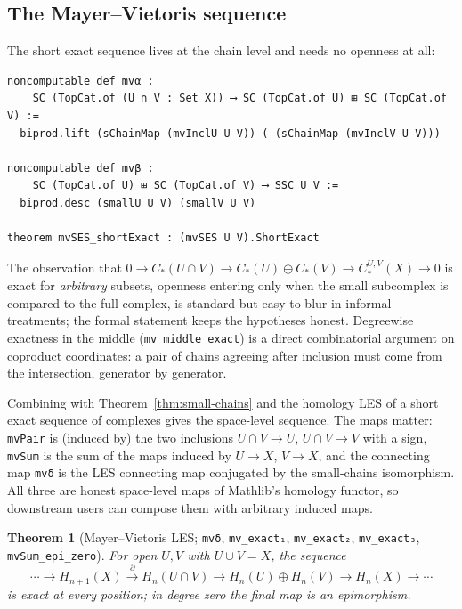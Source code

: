 \documentclass[11pt]{article}
\newtheorem{theorem}{Theorem}[section]
\theoremstyle{remark}
\newcommand{\leanname}[1]{\texttt{#1}}
\begin{document}
\subsection{The Mayer--Vietoris sequence}

The short exact sequence lives at the chain level and needs no openness at
all:

\begin{lstlisting}
noncomputable def mvα :
    SC (TopCat.of (U ∩ V : Set X)) ⟶ SC (TopCat.of U) ⊞ SC (TopCat.of V) :=
  biprod.lift (sChainMap (mvInclU U V)) (-(sChainMap (mvInclV U V)))

noncomputable def mvβ :
    SC (TopCat.of U) ⊞ SC (TopCat.of V) ⟶ SSC U V :=
  biprod.desc (smallU U V) (smallV U V)

theorem mvSES_shortExact : (mvSES U V).ShortExact
\end{lstlisting}

The observation that
$0 \to C_*(U \cap V) \to C_*(U) \oplus C_*(V) \to C^{U,V}_*(X) \to 0$
is exact for \emph{arbitrary} subsets, openness entering only when the small
subcomplex is compared to the full complex, is standard but easy to blur in
informal treatments; the formal statement keeps the hypotheses honest.
Degreewise exactness in the middle
(\leanname{mv\_middle\_exact}) is a direct combinatorial argument on
coproduct coordinates: a pair of chains agreeing after inclusion must come
from the intersection, generator by generator.

Combining with Theorem~\ref{thm:small-chains} and the homology LES of a
short exact sequence of complexes gives the space-level sequence. The maps
matter: \leanname{mvPair} is (induced by) the two inclusions
$U \cap V \to U$, $U \cap V \to V$ with a sign, \leanname{mvSum} is the sum
of the maps induced by $U \to X$, $V \to X$, and the connecting map
\leanname{mvδ} is the LES connecting map conjugated by the small-chains
isomorphism. All three are honest space-level maps of Mathlib's homology
functor, so downstream users can compose them with arbitrary induced maps.

\begin{theorem}[Mayer--Vietoris LES; \leanname{mvδ},
\leanname{mv\_exact₁}, \leanname{mv\_exact₂}, \leanname{mv\_exact₃},
\leanname{mvSum\_epi\_zero}]\label{thm:mv}
For open $U, V$ with $U \cup V = X$, the sequence
\[
\cdots \to H_{n+1}(X) \xrightarrow{\ \partial\ } H_n(U \cap V)
\to H_n(U) \oplus H_n(V) \to H_n(X) \to \cdots
\]
is exact at every position; in degree zero the final map is an epimorphism.
\end{theorem}
\end{document}
